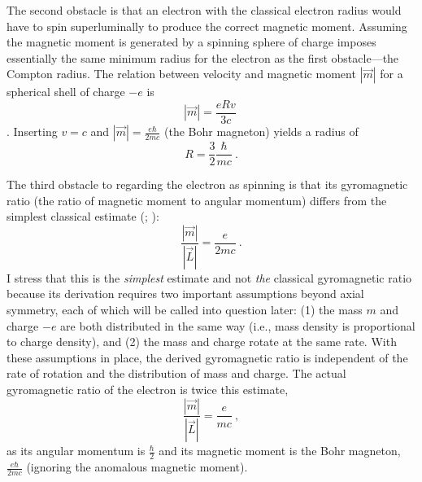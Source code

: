 \documentclass[onecolumn,secnumarabic,amsmath,amssymb,balancelastpage,nofootinbib]{article}
\begin{document}
The second obstacle is that an electron with the classical electron radius would have to spin superluminally to produce the correct magnetic moment.  Assuming the magnetic moment is generated by a spinning sphere of charge imposes essentially the same minimum radius for the electron as the first obstacle---the Compton radius.  The relation between velocity and magnetic moment $|\vec{m}|$ for a spherical shell of charge $-e$ is
\begin{equation}
|\vec{m}| = \frac{e R v}{3 c}\ 
\end{equation}
\citep[pg.\ 127]{rohrlich}.  Inserting $v=c$ and $|\vec{m}|=\frac{e \hbar}{2 m c}$ (the Bohr magneton) yields a radius of
\begin{equation}
R=\frac{3}{2}\frac{\hbar}{m c}\ .
\end{equation}

The third obstacle to regarding the electron as spinning is that its gyromagnetic ratio (the ratio of magnetic moment to angular momentum) differs from the simplest classical estimate (\citealp[problem 5.56]{griffiths}; \citealp[pg.\ 187]{jackson}):
\begin{equation}
\frac{|\vec{m}|}{|\vec{L}|}=\frac{e}{2 m c}\ .
\label{classicalGR}
\end{equation}
I stress that this is the \emph{simplest} estimate and not \emph{the} classical gyromagnetic ratio because its derivation requires two important assumptions beyond axial symmetry, each of which will be called into question later: (1) the mass $m$ and charge $-e$ are both distributed in the same way (i.e., mass density is proportional to charge density), and (2) the mass and charge rotate at the same rate.  With these assumptions in place, the derived gyromagnetic ratio is independent of the rate of rotation and the distribution of mass and charge.  The actual gyromagnetic ratio of the electron is twice this estimate,
\begin{equation}
\frac{|\vec{m}|}{|\vec{L}|}=\frac{e}{m c}\ ,
\label{quantumGR}
\end{equation}
as its angular momentum is $\frac{\hbar}{2}$ and its magnetic moment is the Bohr magneton, $\frac{e \hbar}{2 m c}$ (ignoring the anomalous magnetic moment).
\end{document}
